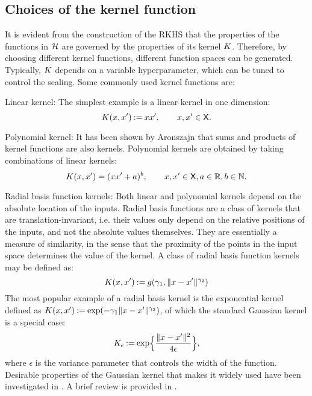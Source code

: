 \subsection{Choices of the kernel function}
It is evident from the construction of the RKHS that the properties of the functions in ${\cal H}$ are governed by the properties of its kernel $K$. Therefore, by choosing different kernel functions, different function spaces can be generated. Typically, $K$ depends on a variable hyperparameter, which can be tuned to control the scaling. Some commonly used kernel functions are:
\begin{arabnum}
\item Linear kernel: The simplest example is a linear kernel in one dimension:
\begin{equation}
K(x,x') \mathbin{:=} x x', \qquad x,x' \in {\sf X}.
\end{equation}
\item Polynomial kernel: It has been shown by Aronszajn \cite{aro50} that sums and products of kernel functions are also kernels. Polynomial kernels are obtained by taking combinations of linear kernels:
\begin{equation}
K(x,x') = (xx' + a)^b, \qquad x,x'\in {\sf X}, a \in \mathbb{R}, b \in \mathbb{N}.
\end{equation}
\item Radial basis function kernels: Both linear and polynomial kernels depend on the absolute location of the inputs. Radial basis functions are a class of kernels that are translation-invariant, i.e. their values only depend on the relative positions of the inputs, and not the absolute values themselves. They are essentially a measure of similarity, in the sense that the proximity of the points in the input space determines the value of the kernel. A class of radial basis function kernels may be defined as:
\begin{equation}
K(x,x') \mathbin{:=} g(\gamma_1, \|x-x'\|^{\gamma_2})
\end{equation}  
The most popular example of a radial basis kernel is the exponential kernel defined as $K(x,x') \mathbin{:=} \exp(-\gamma_1 \|x - x'\|^{\gamma_2})$, of which the standard Gaussian kernel is a special case:
\[
K_\epsilon \mathbin{:=} \exp\Bigl\{\frac{\|x-x'\|^2}{4 \epsilon}\Bigr\},
\]
where $\epsilon$ is the variance parameter that controls the width of the function. Desirable properties of the Gaussian kernel that makes it widely used have been investigated in \cite{min10,stehussco06}. A brief review is provided in . 
\end{arabnum}

